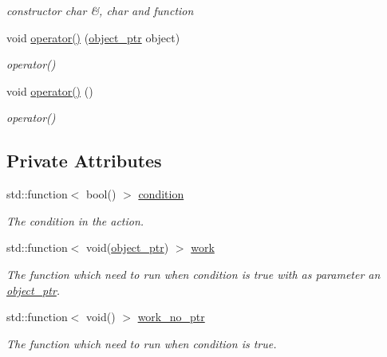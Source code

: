 \begin{DoxyCompactItemize}
\begin{DoxyCompactList}\small\item\em constructor char \&, char and function \end{DoxyCompactList}\item 
void \hyperlink{classaction_ab4f8d0f7552450455977d09a889c18c7}{operator()} (\hyperlink{drawable_8hpp_aab5add95f06d2ba25dbfed8eb07274fa}{object\+\_\+ptr} object)
\begin{DoxyCompactList}\small\item\em operator() \end{DoxyCompactList}\item 
void \hyperlink{classaction_a92c003677656b5b3e6e58b19376e6b04}{operator()} ()
\begin{DoxyCompactList}\small\item\em operator() \end{DoxyCompactList}\end{DoxyCompactItemize}
\subsection*{Private Attributes}
\begin{DoxyCompactItemize}
\item 
\mbox{\label{classaction_a949abf979a5255f54e88a6a4273afebe}} 
std\+::function$<$ bool() $>$ \hyperlink{classaction_a949abf979a5255f54e88a6a4273afebe}{condition}
\begin{DoxyCompactList}\small\item\em The condition in the action. \end{DoxyCompactList}\item 
\mbox{\label{classaction_a711a393fce3b3b22930b651e24eda6c3}} 
std\+::function$<$ void(\hyperlink{drawable_8hpp_aab5add95f06d2ba25dbfed8eb07274fa}{object\+\_\+ptr}) $>$ \hyperlink{classaction_a711a393fce3b3b22930b651e24eda6c3}{work}
\begin{DoxyCompactList}\small\item\em The function which need to run when condition is true with as parameter an \hyperlink{drawable_8hpp_aab5add95f06d2ba25dbfed8eb07274fa}{object\+\_\+ptr}. \end{DoxyCompactList}\item 
\mbox{\label{classaction_a2b895e3240bf7d69ae7f8e3bd7e563d6}} 
std\+::function$<$ void() $>$ \hyperlink{classaction_a2b895e3240bf7d69ae7f8e3bd7e563d6}{work\+\_\+no\+\_\+ptr}
\begin{DoxyCompactList}\small\item\em The function which need to run when condition is true. \end{DoxyCompactList}\end{DoxyCompactItemize}


